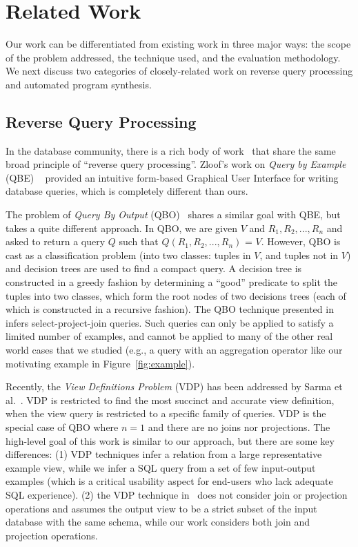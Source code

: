 
\section{Related Work}
\label{sec:related}

Our work can be differentiated from existing work in three major ways: the scope
of the problem addressed, the technique used, and the evaluation methodology.
We next discuss two categories of closely-related work on reverse query processing
and automated program synthesis.


\subsection{Reverse Query Processing}

In the database community, there is a rich body of
work~\cite{Zloof:1975, Tran:2009, DasSarma:2010} that share the same broad principle
of ``reverse query processing''. Zloof's work on \textit{Query by Example} (QBE)
~\cite{Zloof:1975} provided an intuitive form-based Graphical User Interface for
writing database queries, which is completely different than ours.

The problem of \textit{Query By Output} (QBO)~\cite{Tran:2009} shares a similar
goal with QBE, but takes a quite different approach.
In QBO, we are given $V$ and $R_1, R_2, ..., R_n$ and asked to
return a query $Q$ such that $Q(R_1, R_2, ..., R_n)$ = $V$. However, QBO is cast as
a classification problem (into two classes: tuples in $V$, and tuples not in $V$)
and decision trees are used to find a compact query. A decision tree is constructed
in a greedy fashion by determining a ``good'' predicate to split the tuples into two
classes, which form the root nodes of two decisions trees (each of which is
constructed in a recursive fashion).  The QBO technique presented in~\cite{Tran:2009}
infers select-project-join queries. Such queries can only be applied to
satisfy a limited number of examples, and cannot be applied to many of the other
real world cases that we studied (e.g., a query with an aggregation operator
like our motivating example in Figure~\ref{fig:example}).

Recently, the \textit{View Definitions Problem} (VDP) has been addressed
by Sarma et al.~\cite{DasSarma:2010}.
VDP is restricted to find the most succinct and accurate view definition, when
the view query is restricted to a specific family of queries. VDP is the special
case of QBO where $n = 1$ and there are no joins nor projections.
The high-level goal of this work is similar to our approach, but there
are some key differences: (1) VDP techniques infer a relation from a large representative
example view, while we infer a SQL query from a set of few input-output examples
(which is a critical usability aspect for end-users who lack adequate
SQL experience). (2) the VDP technique in~\cite{DasSarma:2010} does
not consider join or projection
operations and assumes the output view to be a strict subset of the input
database with the same schema, while our work considers both join and
projection operations.


